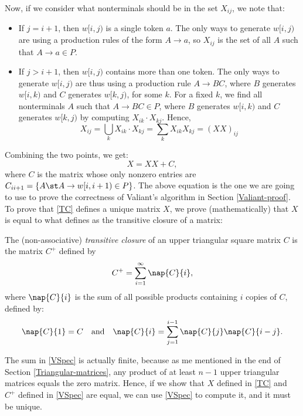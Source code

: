 Now, if we consider what nonterminals should be in the set $X_{i j}$, we note that:
\begin{itemize}
\item If $j = i + 1$, then $w[i,j)$ is a single token $a$. The only ways to generate $w[i,j)$ are using a production rules of the form $A \to a$, so $X_{i j}$ is the set of all $A$ such that $A \to a \in P$.
\item If $j > i + 1$, then $w[i,j)$ contains more than one token. The only ways to generate $w[i,j)$ are thus using a production rule $A \to BC$, where $B$ generates $w[i,k)$ and $C$ generates $w[k,j)$, for some $k$. For a fixed $k$, we find all nonterminals $A$ such that $A \to BC \in P$, where $B$ generates $w[i,k)$ and $C$ generates $w[k,j)$ by computing $X_{i k} \cdot X_{k j}$. Hence, 
            \begin{equation}
              X_{i j} = \bigcup_k X_{i k}\cdot X_{k j} = \sum_kX_{i k}X_{k j} = (XX)_{i j}
            \end{equation}
\end{itemize}
Combining the two points, we get:
\begin{equation}
  \label{TC}
  X = XX + C,
\end{equation}
where $C$ is the matrix whose only nonzero entries are $C_{i i+1} = \{A \st A \to w[i,i+1) \in P\}$. The above equation is the one we are going to use to prove the correctness of Valiant's algorithm in Section \ref{Valiant-proof}. To prove that \eqref{TC} defines a unique matrix $X$, we prove (mathematically) that $X$  is equal to what \cite{Valiant} defines as the transitive closure of a matrix:
\begin{Definition}
  The (non-associative) \emph{transitive closure} of an upper triangular square matrix $C$ is the matrix $C^+$ defined by
  \begin{equation}\label{VSpec}
    C^+ = \sum_{i = 1}^\infty \nap{C}{i},
  \end{equation}
  where $\nap{C}{i}$ is the sum of all possible products containing $i$ copies of $C$, defined by:
  \begin{equation*}
    \nap{C}{1} = C \quad \text{and} \quad \nap{C}{i} = \sum_{j = 1}^{i - 1}\nap{C}{j}\nap{C}{i - j}.
  \end{equation*}
\end{Definition}
 The sum in \eqref{VSpec} is actually finite, because as me mentioned in the end of Section \ref{Triangular-matrices}, any product of at least $n -1$ upper triangular matrices equals the zero matrix. Hence, if we show that $X$ defined in \eqref{TC} and $C^+$ defined in \eqref{VSpec} are equal, we can use \eqref{VSpec} to compute it, and it must be unique.
